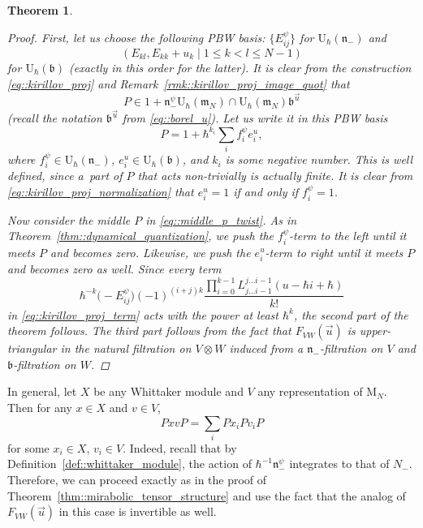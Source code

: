 \documentclass[10pt,a4paper]{amsart}
\numberwithin{equation}{section}
\newtheorem{Theorem}{Theorem}[section]
\newcommand{\U}{\mathrm{U}_{\hbar}}
\newcommand{\rM}{\mathrm{M}}
\renewcommand{\b}{\mathfrak{b}}
\newcommand{\n}{\mathfrak{n}}
\newcommand{\m}{\mathfrak{m}}
\begin{document}
\begin{Theorem}
\begin{proof}
			First, let us choose the following PBW basis: $\bigl\{E_{ij}^{\psi}\bigr\}$ for $\U(\n_-)$ and
			\[
			(E_{kl}, E_{kk} + u_k \mid 1 \leq k < l \leq N-1)
			\]
			for $\U(\b)$ (exactly in this order for the latter). It is clear from the construction \eqref{eq::kirillov_proj} and Remark~\ref{rmk::kirillov_proj_image_quot} that
			\begin{equation}
				\label{eq::kirillov_proj_normalization}
				P \in 1 + \n_-^{\psi} \U(\m_N) \cap \U(\m_N) \b^{\vec{u}}
			\end{equation}
			(recall the notation $\b^{\vec{u}}$ from \eqref{eq::borel_u}). Let us write it in this PBW basis
			\begin{equation*}
				P = 1 + \hbar^{k_i}\sum\limits_i f^{\psi}_i e_i^u,
			\end{equation*}
			where $f^{\psi}_i \in \U(\n_-)$, $e_i^u \in \U(\b)$, and $k_i$ is some negative number. This is well defined, since a~part of $P$ that acts non-trivially is actually finite. It is clear from \eqref{eq::kirillov_proj_normalization} that $e^u_i=1$ if and only if $f^{\psi}_i=1$.
			
			Now consider the middle $P$ in \eqref{eq::middle_p_twist}. As in Theorem~\ref{thm::dynamical_quantization}, we push the $f_i^{\psi}$-term to the left until it meets $P$ and becomes zero. Likewise, we push the $e_i^u$-term to right until it meets $P$ and becomes zero as well. Since every term
			\[
			\hbar^{-k} \bigl(-E_{ij}^{\psi}\bigr) (-1)^{(i+j)k} \frac{\prod_{i=0}^{k-1} L_{j \dots i-1}^{j \dots i-1}(u-\hbar i + \hbar)}{k!}
			\]
			in \eqref{eq::kirillov_proj_term} acts with the power at least $\hbar^k$, the second part of the theorem follows. The third part follows from the fact that $F_{VW}(\vec{u})$ is upper-triangular in the natural filtration on $V\otimes W$ induced from a $\n_-$-filtration on $V$ and $\b$-filtration on $W$.
		\end{proof}
	\end{Theorem}
	
	\begin{Remark}
		\label{rmk::mirabolic_tensor_structure}
		In general, let $X$ be any Whittaker module and $V$ any representation of $\rM_N$. Then for any $x\in X$ and $v\in V$,
		\[
		PxvP = \sum\limits_i Px_i P v_i P
		\]
		for some $x_i\in X$, $v_i \in V$. Indeed, recall that by Definition~\ref{def::whittaker_module}, the action of $\hbar^{-1} \n_-^{\psi}$ integrates to that of $N_-$. Therefore, we can proceed exactly as in the proof of Theorem~\ref{thm::mirabolic_tensor_structure} and use the fact that the analog of $F_{VW}(\vec{u})$ in this case is invertible as well.
	\end{Remark}
	
\end{document}
